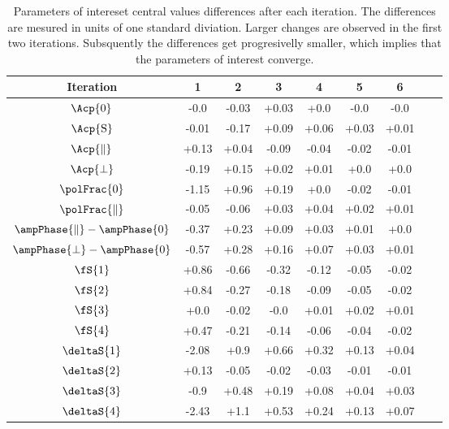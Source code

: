 \begin{table}
\centering
\footnotesize
\begin{tabular}{ c c c c c c c c c }
  \hline
  Iteration          &       1       &       2       &       3       &       4       &       5       &       6 \\  
  \hline
  $\Acp{0}$                          &  -0.0   &  -0.03  &  +0.03  &  +0.0   &  -0.0   &  -0.0    \\  
  $\Acp{\text{S}}$                   &  -0.01  &  -0.17  &  +0.09  &  +0.06  &  +0.03  &  +0.01   \\  
  $\Acp{\parallel}$                  &  +0.13  &  +0.04  &  -0.09  &  -0.04  &  -0.02  &  -0.01   \\  
  $\Acp{\perp}$                      &  -0.19  &  +0.15  &  +0.02  &  +0.01  &  +0.0   &  +0.0    \\  
  $\polFrac{0}$                      &  -1.15  &  +0.96  &  +0.19  &  +0.0   &  -0.02  &  -0.01   \\  
  $\polFrac{\parallel}$              &  -0.05  &  -0.06  &  +0.03  &  +0.04  &  +0.02  &  +0.01   \\  
  $\ampPhase{\parallel}-\ampPhase{0}$ &  -0.37  &  +0.23  &  +0.09  &  +0.03  &  +0.01  &  +0.0    \\  
  $\ampPhase{\perp}-\ampPhase{0}$     &  -0.57  &  +0.28  &  +0.16  &  +0.07  &  +0.03  &  +0.01   \\  
  $\fS{1}$                           &  +0.86  &  -0.66  &  -0.32  &  -0.12  &  -0.05  &  -0.02   \\  
  $\fS{2}$                           &  +0.84  &  -0.27  &  -0.18  &  -0.09  &  -0.05  &  -0.02   \\  
  $\fS{3}$                           &  +0.0   &  -0.02  &  -0.0   &  +0.01  &  +0.02  &  +0.01   \\  
  $\fS{4}$                           &  +0.47  &  -0.21  &  -0.14  &  -0.06  &  -0.04  &  -0.02   \\  
  $\deltaS{1}$                       &  -2.08  &  +0.9   &  +0.66  &  +0.32  &  +0.13  &  +0.04   \\  
  $\deltaS{2}$                       &  +0.13  &  -0.05  &  -0.02  &  -0.03  &  -0.01  &  -0.01   \\  
  $\deltaS{3}$                       &  -0.9   &  +0.48  &  +0.19  &  +0.08  &  +0.04  &  +0.03   \\  
  $\deltaS{4}$                       &  -2.43  &  +1.1   &  +0.53  &  +0.24  &  +0.13  &  +0.07   \\  
  \hline
\end{tabular}
\caption{Parameters of intereset central values differences after each iteration. The differences are mesured in units of one
         standard diviation. Larger changes are observed in the first two iterations. Subsquently the differences get progresivelly
         smaller, which implies that the parameters of interest converge.}
\label{pars_convergence}
\end{table}


